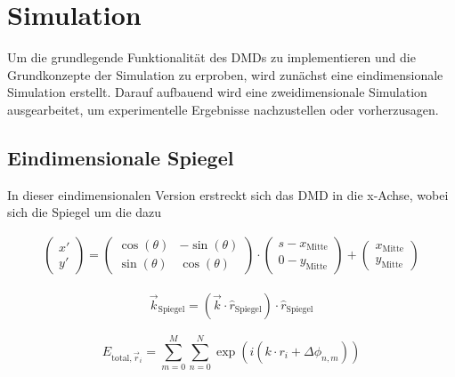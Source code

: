 \section{Simulation}
Um die grundlegende Funktionalität des DMDs zu implementieren und die Grundkonzepte der Simulation zu erproben, wird zunächst eine eindimensionale Simulation erstellt. Darauf aufbauend wird eine zweidimensionale Simulation ausgearbeitet, um experimentelle Ergebnisse nachzustellen oder vorherzusagen.


\subsection{Eindimensionale Spiegel}
In dieser eindimensionalen Version erstreckt sich das DMD in die x-Achse, wobei sich die Spiegel um die dazu 

\begin{equation}
    \begin{aligned}
        \left(\begin{matrix}
            x'\\y'
        \end{matrix}\right) =
        \left(\begin{matrix}
            \cos(\theta) & -\sin(\theta)\\ 
            \sin(\theta) & \cos(\theta)
        \end{matrix}\right) \cdot
        \left(\begin{matrix}
            s - x_{\text{Mitte}}\\ 
            0 - y_{\text{Mitte}}
        \end{matrix}\right) + 
        \left(\begin{matrix}
            x_{\text{Mitte}}\\ 
            y_{\text{Mitte}}
        \end{matrix}\right)
    \end{aligned}
\end{equation}

\begin{equation}
    \begin{aligned}
        \vec{k}_{\text{Spiegel}} = \left(\vec{k}\cdot\hat{r}_{\text{Spiegel}}\right)\cdot\hat{r}_{\text{Spiegel}}
    \end{aligned}
\end{equation}

\begin{equation}
    E_{\text{total}, \vec{r}_i}=\sum_{m=0}^{M}\sum_{n=0}^{N}\exp(i(k\cdot r_i+\Delta\phi_{n, m}))
\end{equation}